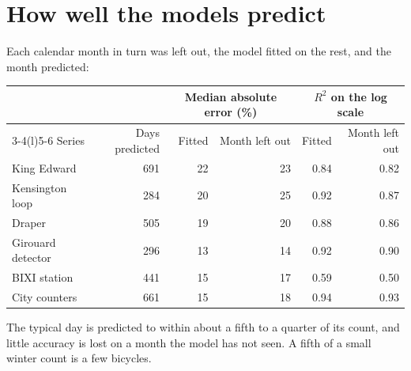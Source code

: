 \documentclass[11pt,a4paper]{article}
\begin{document}
\section{How well the models predict}
Each calendar month in turn was left out, the model fitted on the rest, and the month predicted:
\begin{center}\small\begin{tabular}{@{}lrrrrr@{}}\toprule
 & & \multicolumn{2}{c}{Median absolute error (\%)} & \multicolumn{2}{c}{$R^2$ on the log scale}\\\cmidrule(lr){3-4}\cmidrule(l){5-6}
Series & Days predicted & Fitted & Month left out & Fitted & Month left out\\\midrule
King Edward & 691 & 22 & 23 & 0.84 & 0.82 \\
Kensington loop & 284 & 20 & 25 & 0.92 & 0.87 \\
Draper & 505 & 19 & 20 & 0.88 & 0.86 \\
Girouard detector & 296 & 13 & 14 & 0.92 & 0.90 \\
BIXI station & 441 & 15 & 17 & 0.59 & 0.50 \\
City counters & 661 & 15 & 18 & 0.94 & 0.93 \\
\bottomrule\end{tabular}\end{center}
The typical day is predicted to within about a fifth to a quarter of its count, and little accuracy is lost on a month the model has not seen. A fifth of a small winter count is a few bicycles.
\end{document}
